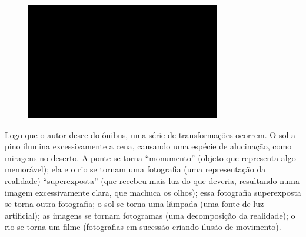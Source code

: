 \begin{figure}[!ht]
\centering
 \includegraphics[width=85mm]{./imgs/im1.jpg}
\caption{\tiny{}}
\end{figure}

Logo que o autor desce do ônibus, uma série de transformações ocorrem. O
sol a pino ilumina excessivamente a cena, causando uma espécie de
alucinação, como miragens no deserto. A ponte se torna ``monumento''
(objeto que representa algo memorável); ela e o rio se tornam uma
fotografia (uma representação da realidade) ``superexposta'' (que
recebeu mais luz do que deveria, resultando numa imagem excessivamente
clara, que machuca os olhos); essa fotografia superexposta se torna
outra fotografia; o sol se torna uma lâmpada (uma fonte de luz
artificial); as imagens se tornam fotogramas (uma decomposição da
realidade); o rio se torna um filme (fotografias em sucessão criando
ilusão de movimento).

